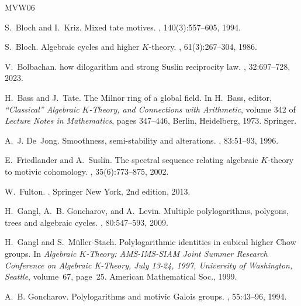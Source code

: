 \documentclass[12pt]{extarticle}
\begin{document}
\begin{thebibliography}{MVW06}

S.~Bloch and I.~Kriz.
\newblock Mixed tate motives.
, 140(3):557--605, 1994.

S.~Bloch.
\newblock Algebraic cycles and higher {$K$}-theory.
, 61(3):267--304, 1986.

V.~Bolbachan.
how dilogarithm and strong {S}uslin reciprocity law.
, 32:697--728, 2023.

H.~Bass and J.~Tate.
\newblock The {M}ilnor ring of a global field.
\newblock In H.~Bass, editor, {\em “{C}lassical” Algebraic {$K$}-{T}heory, and {C}onnections with {A}rithmetic}, volume 342 of {\em Lecture Notes in Mathematics}, pages 347--446, Berlin, Heidelberg, 1973. Springer.

A.~J. De~Jong.
\newblock Smoothness, semi-stability and alterations.
, 83:51--93, 1996.

E.~Friedlander and A.~Suslin.
\newblock The spectral sequence relating algebraic {$K$}-theory to motivic cohomology.
, 35(6):773--875, 2002.

W.~Fulton.
.
\newblock Springer New York, 2nd edition, 2013.

H.~Gangl, A.~B. Goncharov, and A.~Levin.
\newblock Multiple polylogarithms, polygons, trees and algebraic cycles.
, 80:547--593, 2009.

H.~Gangl and S.~Müller-Stach.
\newblock Polylogarithmic identities in cubical higher {C}how groups.
\newblock In {\em Algebraic {$K$}-Theory: AMS-IMS-SIAM Joint Summer Research Conference on Algebraic {K}-Theory, July 13-24, 1997, University of Washington, Seattle}, volume~67, page~25. American Mathematical Soc., 1999.

A.~B. Goncharov.
\newblock Polylogarithms and motivic {G}alois groups.
, 55:43--96, 1994.


\end{thebibliography}
\end{document}
